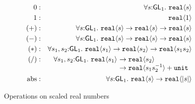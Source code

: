 \documentclass{sigplanconf}
\newcommand{\abs}[1]{\lvert #1 \rvert}
\newcommand{\SynGL}[1]{\mathsf{GL}_#1}
\newcommand{\tyPrim}[2]{\textup{\texttt{#1}}\langle #2 \rangle}
\newcommand{\tyPrimNm}[1]{\textup{\texttt{#1}}}
\theoremstyle{examplestyle}
\theoremstyle{restatementstyle}
\begin{document}
\begin{figure}[t]
  \centering
  \begin{eqnarray*}
    0   &:& \forall s \mathord:\SynGL{1}.\ \tyPrim{real}{s} \\
    1   &:& \tyPrim{real}{1} \\
    (+) &:& \forall s \mathord:\SynGL{1}.\ \tyPrim{real}{s} \to \tyPrim{real}{s} \to \tyPrim{real}{s} \\
    (-) &:& \forall s \mathord:\SynGL{1}.\ \tyPrim{real}{s} \to \tyPrim{real}{s} \to \tyPrim{real}{s} \\
    (*) &:& \forall s_1,s_2 \mathord:\SynGL{1}.\ \tyPrim{real}{s_1} \to \tyPrim{real}{s_2} \to \tyPrim{real}{s_1s_2} \\
    (/) &:&
    \begin{array}[t]{@{}l@{}l}
      \forall s_1,s_2 \mathord:\SynGL{1}.\ \tyPrim{real}{s_1}\ & \to \tyPrim{real}{s_2} \\
      &\to \tyPrim{real}{s_1s_2^{-1}} + \tyPrimNm{unit} \\
    \end{array}\\
    \mathrm{abs} &:& \forall s \mathord:\SynGL{1}.\ \tyPrim{real}{s} \to \tyPrim{real}{\abs{s}} %
  \end{eqnarray*}
  \caption{Operations on scaled real numbers}
  \label{fig:real-ops}
\end{figure}
\end{document}
